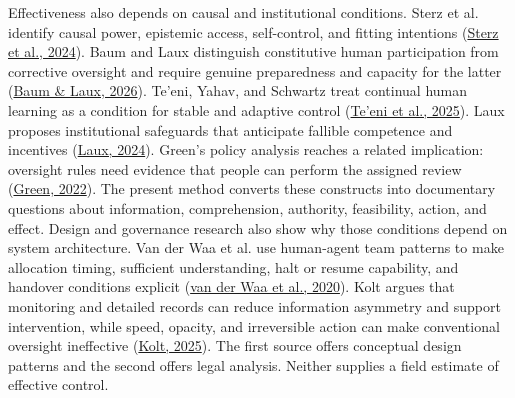 \documentclass[11pt]{article}
\begin{document}
Effectiveness also depends on causal and institutional conditions. Sterz et al. identify causal power, epistemic access, self-control, and fitting intentions (\href{https://doi.org/10.1145/3630106.3659051}{Sterz et al., 2024}). Baum and Laux distinguish constitutive human participation from corrective oversight and require genuine preparedness and capacity for the latter (\href{https://doi.org/10.48550/arXiv.2603.19213}{Baum \& Laux, 2026}). Te'eni, Yahav, and Schwartz treat continual human learning as a condition for stable and adaptive control (\href{https://doi.org/10.1007/s00146-025-02401-y}{Te'eni et al., 2025}). Laux proposes institutional safeguards that anticipate fallible competence and incentives (\href{https://doi.org/10.1007/s00146-023-01777-z}{Laux, 2024}). Green's policy analysis reaches a related implication: oversight rules need evidence that people can perform the assigned review (\href{https://doi.org/10.1016/j.clsr.2022.105681}{Green, 2022}). The present method converts these constructs into documentary questions about information, comprehension, authority, feasibility, action, and effect.
Design and governance research also show why those conditions depend on system architecture. Van der Waa et al. use human-agent team patterns to make allocation timing, sufficient understanding, halt or resume capability, and handover conditions explicit (\href{https://doi.org/10.1007/978-3-030-49183-3_16}{van der Waa et al., 2020}). Kolt argues that monitoring and detailed records can reduce information asymmetry and support intervention, while speed, opacity, and irreversible action can make conventional oversight ineffective (\href{https://arxiv.org/abs/2501.07913}{Kolt, 2025}). The first source offers conceptual design patterns and the second offers legal analysis. Neither supplies a field estimate of effective control.
\end{document}
